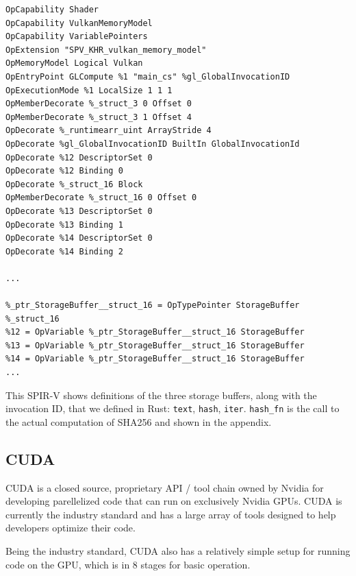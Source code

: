 \documentclass{article}
\begin{document}
\begin{lstlisting}
OpCapability Shader
OpCapability VulkanMemoryModel
OpCapability VariablePointers
OpExtension "SPV_KHR_vulkan_memory_model"
OpMemoryModel Logical Vulkan
OpEntryPoint GLCompute %1 "main_cs" %gl_GlobalInvocationID
OpExecutionMode %1 LocalSize 1 1 1
OpMemberDecorate %_struct_3 0 Offset 0
OpMemberDecorate %_struct_3 1 Offset 4
OpDecorate %_runtimearr_uint ArrayStride 4
OpDecorate %gl_GlobalInvocationID BuiltIn GlobalInvocationId
OpDecorate %12 DescriptorSet 0
OpDecorate %12 Binding 0
OpDecorate %_struct_16 Block
OpMemberDecorate %_struct_16 0 Offset 0
OpDecorate %13 DescriptorSet 0
OpDecorate %13 Binding 1
OpDecorate %14 DescriptorSet 0
OpDecorate %14 Binding 2

...

%_ptr_StorageBuffer__struct_16 = OpTypePointer StorageBuffer %_struct_16
%12 = OpVariable %_ptr_StorageBuffer__struct_16 StorageBuffer
%13 = OpVariable %_ptr_StorageBuffer__struct_16 StorageBuffer
%14 = OpVariable %_ptr_StorageBuffer__struct_16 StorageBuffer
...
\end{lstlisting}

This SPIR-V shows definitions of the three storage buffers, along with the invocation ID, that we defined in Rust: \texttt{text}, \texttt{hash}, \texttt{iter}. \texttt{hash\_fn} is the call to the actual computation of SHA256 and shown in the appendix.

\subsection{CUDA}
CUDA is a closed source, proprietary API / tool chain owned by Nvidia for developing parellelized code that can run on exclusively Nvidia GPUs. CUDA is currently the industry standard and has a large array of tools designed to help developers optimize their code.

Being the industry standard, CUDA also has a relatively simple setup for running code on the GPU, which is in 8 stages for basic operation.
\end{document}
